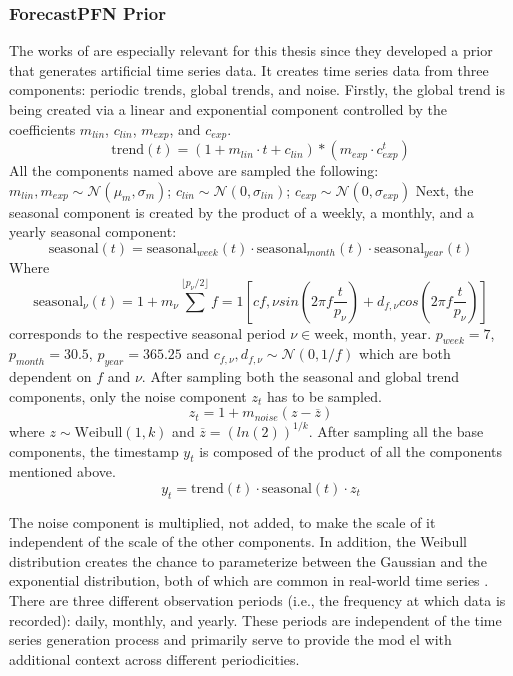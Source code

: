 \subsubsection{ForecastPFN Prior}
The works of \citet{dooley2023forecastpfn} are especially relevant for this thesis since they developed a prior that generates artificial time series data.
It creates time series data from three components: periodic trends, global trends, and noise.
\newline
Firstly, the global trend is being created via a linear and exponential component controlled by the coefficients $m_{lin}$, $c_{lin}$, $m_{exp}$, and $c_{exp}$.
\[
\text{trend}(t)=(1+m_{lin} \cdot t + c_{lin})*(m_{exp} \cdot c_{exp}^t)
\]
All the components named above are sampled the following: $m_{lin}, m_{exp} \sim \mathcal{N}(\mu_m, \sigma_m)$; $c_{lin} \sim \mathcal{N}(0, \sigma_{lin})$; $c_{exp} \sim \mathcal{N}(0, \sigma_{exp})$
\newline
    Next, the seasonal component is created by the product of a weekly, a monthly, and a yearly seasonal component:
\[
\text{seasonal}(t) = \text{seasonal}_{week}(t) \cdot \text{seasonal}_{month}(t) \cdot \text{seasonal}_{year}(t)
\]
Where
\[
\text{seasonal}_{\nu}(t)=1+m_{\nu} \sum^{\lfloor p_{\nu}/2 \rfloor}{f=1} \left[c{f, \nu} sin\left(2\pi f \frac{t}{p_\nu}\right) + d_{f, \nu}cos\left(2 \pi f \frac{t}{p_{\nu}}\right)\right]
\]
corresponds to the respective seasonal period $\nu \in {\text{week, month, year}}$. $p_{week} = 7$, $p_{month}=30.5$, $p_{year}=365.25$ and $c_{f, \nu}, d_{f, \nu} \sim \mathcal{N}(0, 1/f)$ which are both dependent on $f$ and $\nu$.
\newline
After sampling both the seasonal and global trend components, only the noise component $z_t$ has to be sampled.
\[
z_t = 1 + m_{noise}(z - \overline{z})
\]
where $z \sim \text{Weibull}(1, k)$ and $\overline{z} = (ln(2))^{1/k}$.
\newline
After sampling all the base components, the timestamp $y_t$ is composed of the product of all the components mentioned above.
\[
y_t = \text{trend}(t) \cdot \text{seasonal}(t) \cdot z_t
\]

The noise component is multiplied, not added, to make the scale of it independent of the scale of the other components.
In addition, the Weibull distribution creates the chance to parameterize between the Gaussian and the exponential distribution, both of which are common in real-world time series \citep{dooley2023forecastpfn}.
\newline
There are three different observation periods (i.e., the frequency at which data is recorded): daily, monthly, and yearly.
These periods are independent of the time series generation process and primarily serve to provide the mod  el with additional context across different periodicities.

